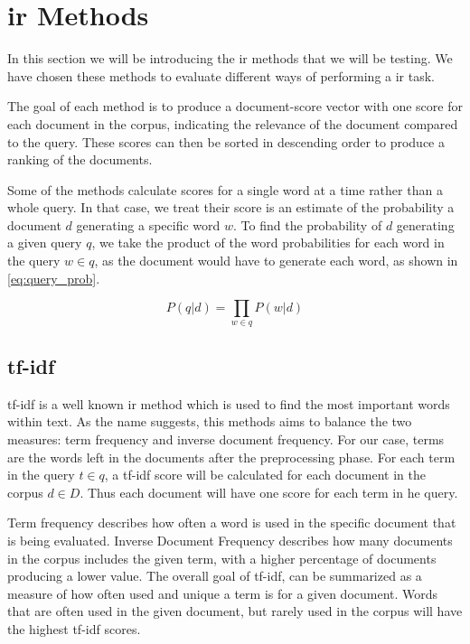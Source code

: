 \section{\gls{ir} Methods}\label{sec:ir_methods}

In this section we will be introducing the \gls{ir} methods that we will be testing.
We have chosen these methods to evaluate different ways of performing a \acrfull{ir} task.

The goal of each method is to produce a document-score vector with one score for each document in the corpus, indicating the relevance of the document compared to the query.
These scores can then be sorted in descending order to produce a ranking of the documents.

Some of the methods calculate scores for a single word at a time rather than a whole query.
In that case, we treat their score is an estimate of the probability a document $d$ generating a specific word $w$.
To find the probability of $d$ generating a given query $q$, we take the product of the word probabilities for each word in the query $w \in q$, as the document would have to generate each word, as shown in \autoref{eq:query_prob}.

\begin{equation}\label{eq:query_prob}
	P(q|d) = \prod_{w \in q} P(w|d)
\end{equation}





\subsection{\acrlong{tf-idf}}
\Gls{tf-idf} is a well known \gls{ir} method which is used to find the most important words within text.
As the name suggests, this methods aims to balance the two measures: term frequency and inverse document frequency.
For our case, terms are the words left in the documents after the preprocessing phase.
For each term in the query $t \in q$, a tf-idf score will be calculated for each document in the corpus $d \in D$.
Thus each document will have one score for each term in he query.


Term frequency describes how often a word is used in the specific document that is being evaluated.
Inverse Document Frequency describes how many documents in the corpus includes the given term, with a higher percentage of documents producing a lower value.
The overall goal of \gls{tf-idf}, can be summarized as a measure of how often used and unique a term is for a given document. Words that are often used in the given document, but rarely used in the corpus will have the highest \gls{tf-idf} scores.


